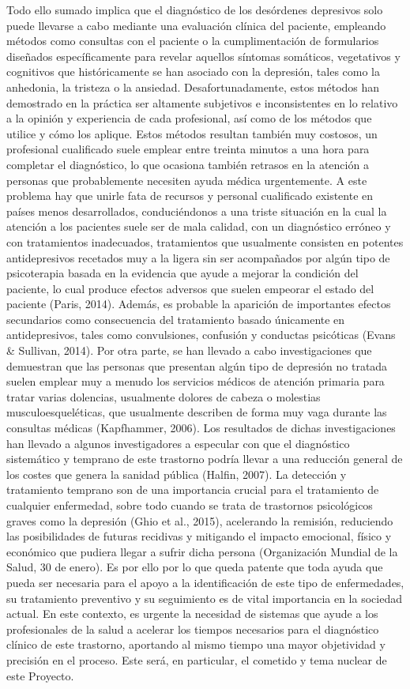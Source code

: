 Todo ello sumado implica que el diagnóstico de los desórdenes depresivos solo puede llevarse a cabo mediante una evaluación clínica del paciente, empleando métodos como consultas con el paciente o la cumplimentación de formularios diseñados específicamente para revelar aquellos síntomas somáticos, vegetativos y cognitivos que históricamente se han asociado con la depresión, tales como la anhedonia, la tristeza o la ansiedad. Desafortunadamente, estos métodos han demostrado en la práctica ser altamente subjetivos e inconsistentes en lo relativo a la opinión y experiencia de cada profesional, así como de los métodos que utilice y cómo los aplique. Estos métodos resultan también muy costosos, un profesional cualificado suele emplear entre treinta minutos a una hora para completar el diagnóstico, lo que ocasiona también retrasos en la atención a personas que probablemente necesiten ayuda médica urgentemente.
A este problema hay que unirle fata de recursos y personal cualificado existente en países menos desarrollados, conduciéndonos a una triste situación en la cual la atención a los pacientes suele ser de mala calidad, con un diagnóstico erróneo y con tratamientos inadecuados, tratamientos que usualmente consisten en potentes antidepresivos recetados muy a la ligera sin ser acompañados por algún tipo de psicoterapia basada en la evidencia que ayude a mejorar la condición del paciente, lo cual produce efectos adversos que suelen empeorar el estado del paciente (Paris, 2014). Además, es probable la aparición de importantes efectos secundarios como consecuencia del tratamiento basado únicamente en antidepresivos, tales como convulsiones, confusión y conductas psicóticas (Evans & Sullivan, 2014).
Por otra parte, se han llevado a cabo investigaciones que demuestran que las personas que presentan algún tipo de depresión no tratada suelen emplear muy a menudo los servicios médicos de atención primaria para tratar varias dolencias, usualmente dolores de cabeza o molestias musculoesqueléticas, que usualmente describen de forma muy vaga durante las consultas médicas (Kapfhammer, 2006). Los resultados de dichas investigaciones han llevado a algunos investigadores a especular con que el diagnóstico sistemático y temprano de este trastorno podría llevar a una reducción general de los costes que genera la sanidad pública (Halfin, 2007).
La detección y tratamiento temprano son de una importancia crucial para el tratamiento de cualquier enfermedad, sobre todo cuando se trata de trastornos psicológicos graves como la depresión (Ghio et al., 2015), acelerando la remisión, reduciendo las posibilidades de futuras recidivas y mitigando el impacto emocional, físico y económico que pudiera llegar a sufrir dicha persona (Organización Mundial de la Salud, 30 de enero).
Es por ello por lo que queda patente que toda ayuda que pueda ser necesaria para el apoyo a la identificación de este tipo de enfermedades, su tratamiento preventivo y su seguimiento es de vital importancia en la sociedad actual. En este contexto, es urgente la necesidad de sistemas que ayude a los profesionales de la salud a acelerar los tiempos necesarios para el diagnóstico clínico de este trastorno, aportando al mismo tiempo una mayor objetividad y precisión en el proceso. Este será, en particular, el cometido y tema nuclear de este Proyecto.

